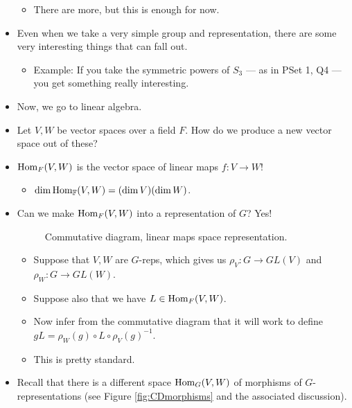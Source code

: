 \documentclass[../notes.tex]{subfiles}
\begin{document}
\begin{itemize}
\begin{itemize}
        \item There are more, but this is enough for now.
    \end{itemize}
    \item Even when we take a very simple group and representation, there are some very interesting things that can fall out.
    \begin{itemize}
        \item Example: If you take the symmetric powers of $S_3$ --- as in PSet 1, Q4 --- you get something really interesting.
    \end{itemize}
    \item Now, we go to linear algebra.
    \item Let $V,W$ be vector spaces over a field $F$. How do we produce a new vector space out of these?
    \item $\operatorname{Hom}_F(V,W)$ is the vector space of linear maps $f:V\to W$!
    \begin{itemize}
        \item $\dim\operatorname{Hom}_{\mathbb{F}}(V,W)=(\dim V)(\dim W)$.
    \end{itemize}
    \item Can we make $\operatorname{Hom}_F(V,W)$ into a representation of $G$? Yes!
    \begin{figure}[H]
        \centering
        \DisableQuotes
        \EnableQuotes
        \vspace{-1.5em}
        \caption{Commutative diagram, linear maps space representation.}
        \label{fig:CDlinMapsRep}
    \end{figure}
    \begin{itemize}
        \item Suppose that $V,W$ are $G$-reps, which gives us $\rho_V:G\to GL(V)$ and $\rho_W:G\to GL(W)$.
        \item Suppose also that we have $L\in\operatorname{Hom}_F(V,W)$.
        \item Now infer from the commutative diagram that it will work to define $gL=\rho_W(g)\circ L\circ\rho_V(g)^{-1}$.
        \item This is pretty standard.
    \end{itemize}
    \item Recall that there is a different space $\operatorname{Hom}_G(V,W)$ of morphisms of $G$-representations (see Figure \ref{fig:CDmorphisms} and the associated discussion).

\end{itemize}
\end{document}

